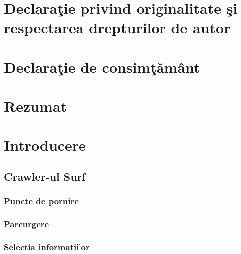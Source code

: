 \documentclass[12pt,oneside]{report}
\newcommand{\chaptertitle}[1]{\LARGE{#1}}
\begin{document}

\chapter*{
	\large{
		Declara\c{t}ie privind originalitate \c{s}i respectarea drepturilor de autor
	}
}



\chapter*{
	\large{
		Declara\c{t}ie de consim\c{t}\u{a}m\^{a}nt
	}
}



\chapter*{\chaptertitle{Rezumat}}

\newpage



\tableofcontents
\clearpage

\chapter*{\chaptertitle{Introducere}}

\clearpage

\section{Crawler-ul Surf}


\subsection{Puncte de pornire}


\subsection{Parcurgere}


\subsection{Selectia informatiilor}

\end{document}
